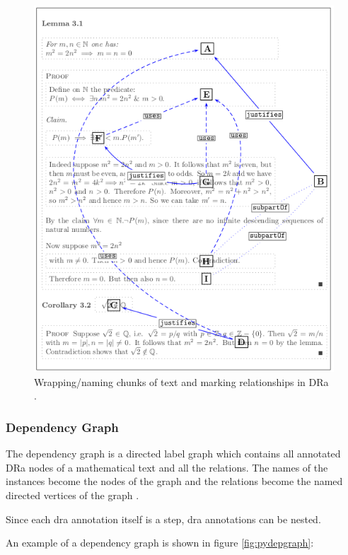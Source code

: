 \begin{figure}[H]
\begin{center}
\includegraphics[scale=0.8]{Figures/Background/dranotation.png}
\end{center}
\caption{Wrapping/naming chunks of text and marking relationships in DRa \cite{zengfirstyear}. \label{fig:draannotate}}
\end{figure}

\subsubsection{Dependency Graph}

The dependency graph is a directed label graph which contains all annotated DRa nodes of a mathematical text and all the relations. The names of the instances become the nodes of the graph and the relations become the named directed vertices of the graph \cite{zengfirstyear}.

Since each \gls{dra} annotation itself is a step, \gls{dra} annotations can be nested. 

An example of a dependency graph is shown in figure \ref{fig:pydepgraph}:

